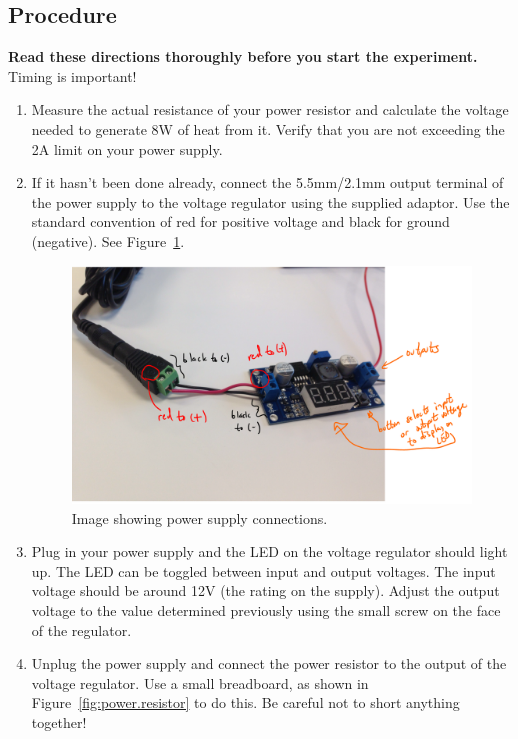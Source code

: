 \documentclass[11pt]{article} %
\begin{document}
\subsection*{Procedure}
{\bf Read these directions thoroughly before you start the experiment.} Timing is important!
\begin{enumerate}
\item Measure the actual resistance of your power resistor and calculate the voltage needed to generate 8W of heat from it. Verify that you are not exceeding the 2A limit on your power supply.
\item If it hasn’t been done already, connect the 5.5mm/2.1mm output terminal of the power supply to the voltage regulator using the supplied adaptor. Use the standard convention of red for positive voltage and black for ground (negative). See Figure~\ref{fig:power.supply}.

\begin{figure}
\centering
\includegraphics[width=4.5in ]{figures/powersupply}
\caption{Image showing power supply connections.}
\label{fig:power.supply}
\end{figure}

\item Plug in your power supply and the LED on the voltage regulator should light up. The LED can be toggled between input and output voltages. The input voltage should be around 12V (the rating on the supply). Adjust the output voltage to the value determined previously using the small screw on the face of the regulator.
\item Unplug the power supply and connect the power resistor to the output of the voltage regulator. Use a small breadboard, as shown in Figure~\ref{fig:power.resistor} to do this. Be careful not to short anything together!


\end{enumerate}
\end{document}
